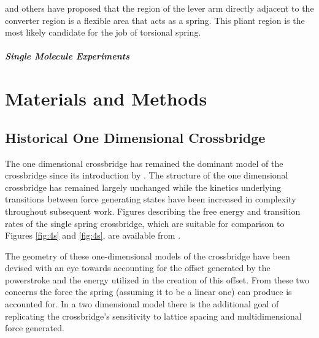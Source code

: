 \documentclass[]{article}
\begin{document}
\cite{Houdusse:2001:p182} and others have proposed that the region of the lever arm directly adjacent to the converter region is a flexible area that acts as a spring. This pliant region is the most likely candidate for the job of torsional spring. 



\subparagraph*{Single Molecule Experiments}



\section*{Materials and Methods}


\subsection*{Historical One Dimensional Crossbridge}


The one dimensional crossbridge has remained the dominant model of the crossbridge since its introduction by \citet{Huxley1957e}. 
The structure of the one dimensional crossbridge has remained largely unchanged while the kinetics underlying transitions between force generating states have been increased in complexity throughout subsequent work. \citep{PateCooke1988, Daniel1998a,Chase2004a,Tanner2007a}
Figures describing the free energy and transition rates of the single spring crossbridge, which are suitable for comparison to Figures \ref{fig:4s} and \ref{fig:4s}, are available from \citet{Tanner2007a}.

The geometry of these one-dimensional models of the crossbridge have been devised with an eye towards accounting for the offset generated by the powerstroke and the energy utilized in the creation of this offset. 
From these two concerns the force the spring (assuming it to be a linear one) can produce is accounted for. 
In a two dimensional model there is the additional goal of replicating the crossbridge's sensitivity to lattice spacing and multidimensional force generated. 
\end{document}
